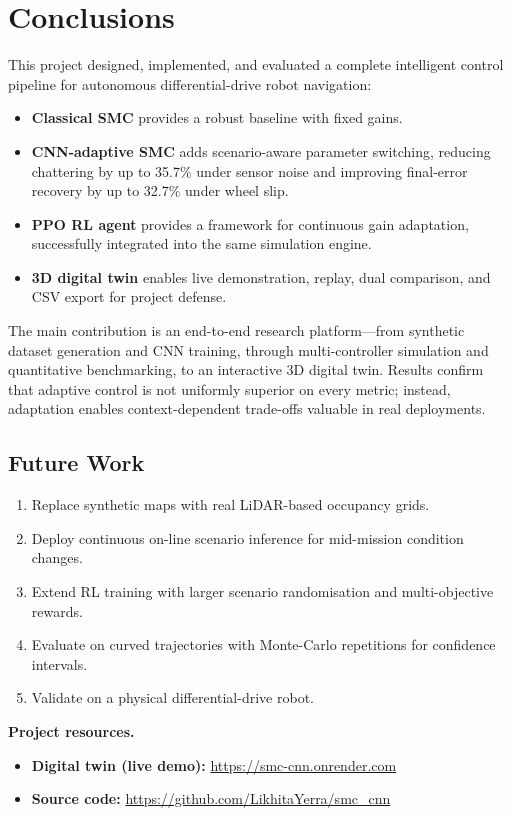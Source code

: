 \documentclass[11pt,a4paper]{article}
\begin{document}
\section{Conclusions}

This project designed, implemented, and evaluated a complete intelligent control pipeline for autonomous differential-drive robot navigation:

\begin{itemize}
  \item \textbf{Classical SMC} provides a robust baseline with fixed gains.
  \item \textbf{CNN-adaptive SMC} adds scenario-aware parameter switching, reducing chattering by up to 35.7\% under sensor noise and improving final-error recovery by up to 32.7\% under wheel slip.
  \item \textbf{PPO RL agent} provides a framework for continuous gain adaptation, successfully integrated into the same simulation engine.
  \item \textbf{3D digital twin} enables live demonstration, replay, dual comparison, and CSV export for project defense.
\end{itemize}

The main contribution is an end-to-end research platform---from synthetic dataset generation and CNN training, through multi-controller simulation and quantitative benchmarking, to an interactive 3D digital twin. Results confirm that adaptive control is not uniformly superior on every metric; instead, adaptation enables context-dependent trade-offs valuable in real deployments.

\subsection{Future Work}

\begin{enumerate}
  \item Replace synthetic maps with real LiDAR-based occupancy grids.
  \item Deploy continuous on-line scenario inference for mid-mission condition changes.
  \item Extend RL training with larger scenario randomisation and multi-objective rewards.
  \item Evaluate on curved trajectories with Monte-Carlo repetitions for confidence intervals.
  \item Validate on a physical differential-drive robot.
\end{enumerate}

\vspace{1em}
\noindent\textbf{Project resources.}
\begin{itemize}
  \item \textbf{Digital twin (live demo):} \url{https://smc-cnn.onrender.com}
  \item \textbf{Source code:} \url{https://github.com/LikhitaYerra/smc_cnn}
\end{itemize}



\end{document}
